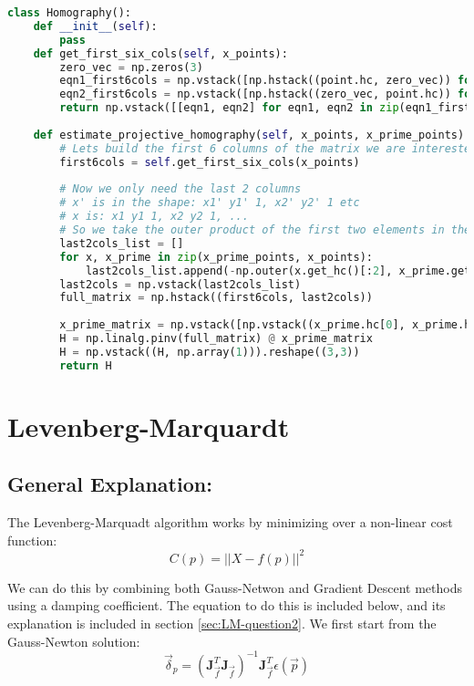\documentclass{article}
\begin{document}
\begin{lstlisting}[language=Python]
class Homography():
    def __init__(self):
        pass
    def get_first_six_cols(self, x_points):
        zero_vec = np.zeros(3)
        eqn1_first6cols = np.vstack([np.hstack((point.hc, zero_vec)) for point in x_points])
        eqn2_first6cols = np.vstack([np.hstack((zero_vec, point.hc)) for point in x_points])
        return np.vstack([[eqn1, eqn2] for eqn1, eqn2 in zip(eqn1_first6cols, eqn2_first6cols)]) # Stack the rows in an interleaved fashion
        
    def estimate_projective_homography(self, x_points, x_prime_points):
        # Lets build the first 6 columns of the matrix we are interested in:
        first6cols = self.get_first_six_cols(x_points)
        
        # Now we only need the last 2 columns
        # x' is in the shape: x1' y1' 1, x2' y2' 1 etc
        # x is: x1 y1 1, x2 y2 1, ...
        # So we take the outer product of the first two elements in the homogeneous form to get the remaining portion:
        last2cols_list = []
        for x, x_prime in zip(x_prime_points, x_points):
            last2cols_list.append(-np.outer(x.get_hc()[:2], x_prime.get_hc()[:2]))
        last2cols = np.vstack(last2cols_list)
        full_matrix = np.hstack((first6cols, last2cols))
        
        x_prime_matrix = np.vstack([np.vstack((x_prime.hc[0], x_prime.hc[1])) for x_prime in x_prime_points])
        H = np.linalg.pinv(full_matrix) @ x_prime_matrix
        H = np.vstack((H, np.array(1))).reshape((3,3))
        return H
\end{lstlisting}

\section{Levenberg-Marquardt}
\subsection{General Explanation:}
The Levenberg-Marquadt algorithm works by minimizing over a non-linear cost function:
\[C(p) = ||X - f(p)||^2\]

We can do this by combining both Gauss-Netwon and Gradient Descent methods using a damping coefficient. The equation to do this is included below, and its explanation is included in section \ref{sec:LM-question2}.
We first start from the Gauss-Newton solution:
\[\Vec{\delta}_p = \left(\boldsymbol{J}_{\Vec{f}}^T \boldsymbol{J}_{\Vec{f}}\right)^{-1} \boldsymbol{J}_{\Vec{f}}^T \epsilon(\Vec{p})\]
\end{document}

